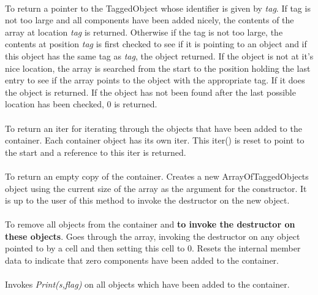 \\
To return a pointer to the TaggedObject whose identifier is given by
{\em tag}. If tag is not too large
and all components have been added nicely, the contents of the array
at location {\em tag} is returned. Otherwise if the tag is not too
large, the contents at position {\em tag} is first checked to see if it
is pointing to an object and if this object has the same tag as {\em
tag}, the object returned. If 
the object is not at it's nice location, the array is searched from
the start to the position holding the last entry to see if the array
points to the object with the appropriate tag. If it does the object
is returned. If the object has not been found after the last possible
location has been checked, $0$ is returned. \\


\\
To return an iter for iterating through the objects that have been
added to the container. Each container object has its own iter. This
iter() is reset to point to the start and a reference to this iter is
returned.\\ 

\\
To return an empty copy of the container. Creates a new
ArrayOfTaggedObjects object using the current size of the array as the
argument for the constructor. It is up to the user of this method to
invoke the destructor on the new object. \\

\\
To remove all objects from the container and {\bf to invoke the
destructor on these objects}. Goes through the array, invoking the
destructor on any object pointed to by a cell and then setting this
cell to $0$. Resets the internal member data to indicate that zero
components have been added to the container.\\

\\
Invokes {\em Print(s,flag)} on all objects which have been added to
the container. 






